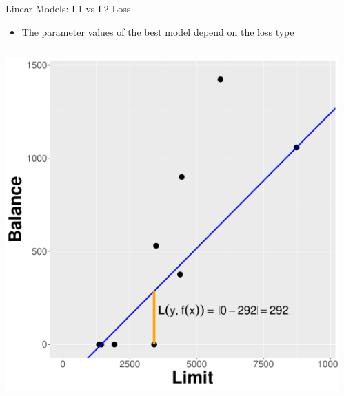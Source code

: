 \documentclass[11pt,compress,t,notes=noshow, xcolor=table]{beamer}
\begin{document}
\begin{vbframe}{Linear Models: L1 vs L2 Loss}

\begin{itemize}
\item \small The parameter values of the best model depend on the loss type
\end{itemize}
\begin{columns}  
\begin{column}{0.5\textwidth} 
\begin{center}
  \includegraphics[width = \textwidth]{figure/nutshell-regression-L1-regr-line.pdf}
\end{center}
\end{column}
\begin{column}{0.5\textwidth} 
\begin{center}

\end{center}
\end{column}
\end{columns}
\end{vbframe}
\end{document}

